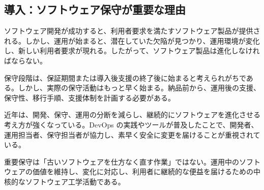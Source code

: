 \subsection{導入：ソフトウェア保守が重要な理由}
ソフトウェア開発が成功すると、利用者要求を満たすソフトウェア製品が提供される。しかし、運用が始まると、潜在していた欠陥が見つかり、運用環境が変化し、新しい利用者要求が現れる。したがって、ソフトウェア製品は進化しなければならない。\par
保守段階は、保証期間または導入後支援の終了後に始まると考えられがちである。しかし、実際の保守活動はもっと早く始まる。納品前から、運用後の支援、保守性、移行手順、支援体制を計画する必要がある。\par
近年は、開発、保守、運用の分断を減らし、継続的にソフトウェアを進化させる考え方が強くなっている。DevOps の実践やツールが普及したことで、開発者、運用担当者、保守担当者が協力し、素早く安全に変更を届けることが重視されている。\par
\begin{pointbox}{重要}保守は「古いソフトウェアを仕方なく直す作業」ではない。運用中のソフトウェアの価値を維持し、変化に対応し、利用者に継続的な便益を届けるための中核的なソフトウェア工学活動である。\end{pointbox}
